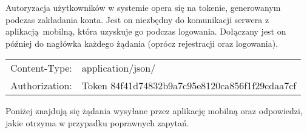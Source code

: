 Autoryzacja użytkowników w systemie opera się na tokenie, generowanym podczas zakładania konta. Jest on niezbędny do komunikacji serwera z aplikacją mobilną, która uzyskuje go podczas logowania. Dołączany jest on później do nagłówka każdego żądania (oprócz rejestracji oraz logowania).

\label{naglowek_zadania}
\vspace{-0.3cm}
\begin{table}[h]
	\begin{center}
		\begin{tabular}{ rl }
			Content-Type:&application/json/\\
			Authorization:&Token 84f41d74832b9a7c95e8120ca856f1f29cdaa7cf\\
		\end{tabular}
	\end{center}
\end{table}

Poniżej znajdują się żądania wysyłane przez aplikację mobilną oraz odpowiedzi, jakie otrzyma w przypadku poprawnych zapytań.


\vspace{0.5cm}

